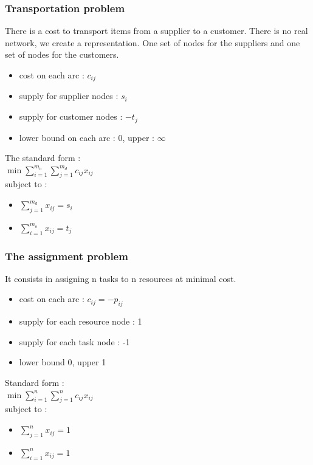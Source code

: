 \documentclass[../main.tex]{subfiles}
\begin{document}
\subsubsection{Transportation problem}
There is a cost to transport items from a supplier to a customer. There is no real network, we create a representation. One set of nodes for the suppliers and one set of nodes for the customers.\\
\begin{itemize}
    \item cost on each arc : $c_{ij}$\\
    \item supply for supplier nodes : $s_i$\\
    \item supply for customer nodes : $-t_j$\\
    \item lower bound on each arc : 0, upper : $\infty$\\
\end{itemize}

The standard form : \\
$\min \sum_{i=1}^{m_o} \sum_{j=1}^{m_d} c_{ij}x_{ij}$\\
subject to : \begin{itemize}
    \item $\sum_{j=1}^{m_d} x_{ij} = s_i$\\
    \item $\sum_{i=1}^{m_o} x_{ij} = t_j$\\
\end{itemize}

\subsubsection{The assignment problem}
It consists in assigning n tasks to n resources at minimal cost.
\begin{itemize}
    \item cost on each arc : $c_{ij} = -p_{ij}$\\
    \item supply for each resource node : 1\\
    \item supply for each task node : -1\\
    \item lower bound 0, upper 1\\
\end{itemize}

Standard form : \\
$\min \sum_{i=1}^n \sum_{j=1}^n c_{ij}x_{ij}$\\
subject to : \begin{itemize}
    \item $\sum_{j=1}^n x_{ij}=1$\\
    \item $\sum_{i=1}^n x_{ij}=1$\\
\end{itemize}
\end{document}
